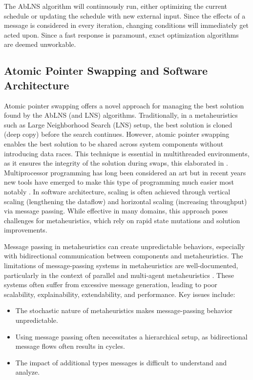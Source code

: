The AbLNS algorithm will continuously run, either optimizing the current
schedule or updating the schedule with new external input. Since the
effects of a message is considered in every iteration, changing conditions
will immediately get acted upon. Since a fast response is paramount, exact
optimization algorithms are deemed unworkable.

\subsection{Atomic Pointer Swapping and Software Architecture}
Atomic pointer swapping offers a novel approach for managing the best
solution found by the AbLNS (and LNS) algorithms.
Traditionally, in a metaheuristics such as Large Neighborhood Search (LNS)
setup, the best solution is cloned (deep copy) before the search continues. However, atomic
pointer swapping enables the best solution to be shared across system components
without introducing data races. This technique is essential in multithreaded
environments, as it ensures the integrity of the solution during swaps, this elaborated in 
\citep{herlihy2020art}. Multiprocessor programming has long been considered an art but 
in recent years new tools have emerged to make this type of programming much 
easier most notably \citep{noauthor_rust_nodate}. In
software architecture, scaling is often achieved through vertical scaling
(lengthening the dataflow) and horizontal scaling (increasing throughput)
via message passing. While effective in many domains, this approach poses
challenges for metaheuristics, which rely on rapid state mutations and solution
improvements.

Message passing in metaheuristics can create unpredictable behaviors, especially
with bidirectional communication between components and metaheuristics. The
limitations of message-passing systems in metaheuristics are well-documented,
particularly in the context of parallel and multi-agent metaheuristics
\citep{talbiMetaheuristicsDesignImplementation2009}. These systems often suffer
from excessive message generation, leading to poor scalability, explainability,
extendability, and performance. Key issues include:

\begin{itemize} 
	\item The stochastic nature
		of metaheuristics makes message-passing behavior unpredictable. 
	\item Using message passing often necessitates a
		hierarchical setup, as bidirectional message flows often results in cycles. 
	\item The
		impact of additional types messages is difficult to understand and analyze. 
\end{itemize}

